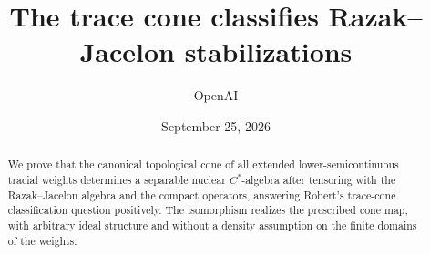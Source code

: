 \documentclass[11pt]{article}
\title{The trace cone classifies Razak--Jacelon stabilizations}
\author{OpenAI}
\date{September 25, 2026}
\begin{document}
\maketitle
\begin{abstract}
We prove that the canonical topological cone of all extended
lower-semicontinuous tracial weights determines a separable nuclear
\(C^*\)-algebra after tensoring with the Razak--Jacelon algebra and the
compact operators, answering Robert's trace-cone classification question
positively. The isomorphism realizes the prescribed cone map, with
arbitrary ideal structure and without a density assumption on the finite
domains of the weights.
\end{abstract}

\tableofcontents











\begingroup
\small
\raggedright

\endgroup
\end{document}
